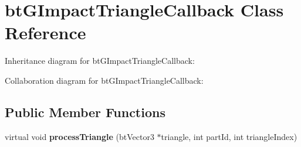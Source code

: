 \hypertarget{classbt_g_impact_triangle_callback}{\section{bt\+G\+Impact\+Triangle\+Callback Class Reference}
\label{classbt_g_impact_triangle_callback}
}


Inheritance diagram for bt\+G\+Impact\+Triangle\+Callback\+:


Collaboration diagram for bt\+G\+Impact\+Triangle\+Callback\+:
\subsection*{Public Member Functions}
\begin{DoxyCompactItemize}
\item 
\hypertarget{classbt_g_impact_triangle_callback_a25a0dea0d62d4567889940576624bcee}{virtual void {\bfseries process\+Triangle} (bt\+Vector3 $\ast$triangle, int part\+Id, int triangle\+Index)}\label{classbt_g_impact_triangle_callback_a25a0dea0d62d4567889940576624bcee}

\end{DoxyCompactItemize}
